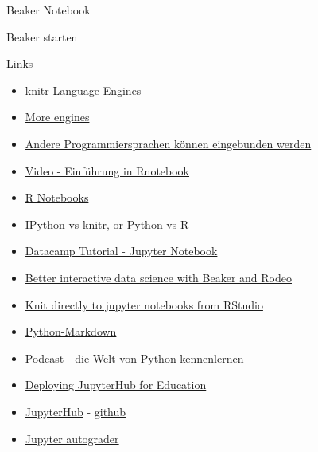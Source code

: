 \documentclass[ignorenonframetext,]{beamer}
\begin{document}
\begin{frame}[fragile]{Beaker Notebook}
\begin{block}{Beaker starten}
\end{block}

\begin{block}{Links}

\begin{itemize}
\item
  \href{http://rmarkdown.rstudio.com/authoring_knitr_engines.html}{knitr
  Language Engines}
\item
  \href{https://yihui.name/knitr/demo/engines/}{More engines}
\item
  \href{http://rmarkdown.rstudio.com/authoring_knitr_engines.html}{Andere
  Programmiersprachen können eingebunden werden}
\item
  \href{https://www.rstudio.com/resources/webinars/introducing-notebooks-with-r-markdown/}{Video
  - Einführung in Rnotebook}
\item
  \href{http://rmarkdown.rstudio.com/r_notebooks.html}{R Notebooks}
\item
  \href{https://yihui.name/en/2012/11/ipython-vs-knitr/}{IPython vs
  knitr, or Python vs R}
\item
  \href{https://www.datacamp.com/community/tutorials/tutorial-jupyter-notebook\#gs.kZqvIvI}{Datacamp
  Tutorial - Jupyter Notebook}
\item
  \href{https://blog.dominodatalab.com/interactive-data-science/}{Better
  interactive data science with Beaker and Rodeo}
\item
  \href{https://www.r-bloggers.com/knit-directly-to-jupyter-notebooks-from-rstudio/}{Knit
  directly to jupyter notebooks from RStudio}
\item
  \href{https://pythonhosted.org/Markdown/}{Python-Markdown}
\item
  \href{https://talkpython.fm/episodes/show/96/exploring-awesome-python}{Podcast
  - die Welt von Python kennenlernen}
\item
  \href{https://developer.rackspace.com/blog/deploying-jupyterhub-for-education/}{Deploying
  JupyterHub for Education}
\item
  \href{https://hub.docker.com/r/jupyterhub/jupyterhub/}{JupyterHub} -
  \href{https://github.com/jupyterhub/jupyterhub}{github}
\item
  \href{https://github.com/data-8/connector-instructors/issues/3}{Jupyter
  autograder}
\end{itemize}

\end{block}

\end{frame}
\end{document}
